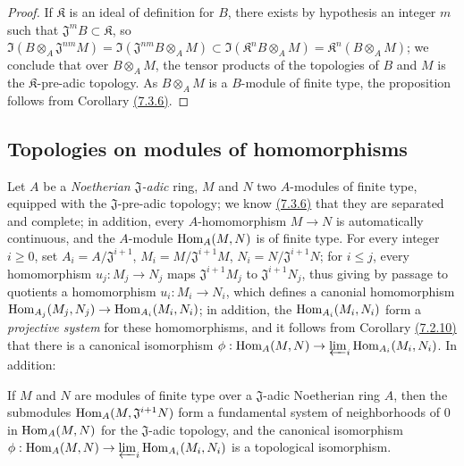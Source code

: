 \begin{proof}
\label{proof-0.7.7.8}
If $\mathfrak{K}$ is an ideal of definition for $B$, there exists by hypothesis an integer $m$ such
that $\mathfrak{J}^m B\subset\mathfrak{K}$, so
$\Im(B\otimes_A\mathfrak{J}^{nm}M)=\Im(\mathfrak{J}^{nm}B\otimes_A M)
  \subset\Im(\mathfrak{K}^n B\otimes_A M)=\mathfrak{K}^n(B\otimes_A M)$;
we conclude that over $B\otimes_A M$, the tensor products of the topologies of $B$ and $M$ is the
$\mathfrak{K}$-pre-adic topology. As $B\otimes_A M$ is a $B$-module of finite type, the proposition
follows from Corollary \hyperref[0.7.3.6]{(7.3.6)}.
\end{proof}

\subsection{Topologies on modules of homomorphisms}
\label{subsection-topologies-on-hom-modules}

\begin{env}[7.8.1]
\label{0.7.8.1}
Let $A$ be a {\em Noetherian $\mathfrak{J}$-adic} ring, $M$ and $N$ two $A$-modules of finite type,
equipped with the $\mathfrak{J}$-pre-adic topology; we know \hyperref[0.7.3.6]{(7.3.6)} that they are
separated and complete; in addition, every $A$-homomorphism $M\to N$ is automatically continuous, and
the $A$-module ${\mathop{\mathrm{Hom}}\nolimits}_A(M,N)$ is of finite type. For every integer $i\geqslant 0$, set
$A_i=A/\mathfrak{J}^{i+1}$, $M_i=M/\mathfrak{J}^{i+1}M$, $N_i=N/\mathfrak{J}^{i+1}N$; for
$i\leqslant j$, every homomorphism $u_j:M_j\to N_j$ maps $\mathfrak{J}^{i+1}M_j$ to
$\mathfrak{J}^{i+1}N_j$, thus giving by passage to quotients a homomorphism $u_i:M_i\to N_i$, which
defines a canonial homomorphism ${\mathop{\mathrm{Hom}}\nolimits}_{A_j}(M_j,N_j)\to{\mathop{\mathrm{Hom}}\nolimits}_{A_i}(M_i,N_i)$; in addition, the
${\mathop{\mathrm{Hom}}\nolimits}_{A_i}(M_i,N_i)$ form a {\em projective system} for these homomorphisms, and it follows from
Corollary \hyperref[0.7.2.10]{(7.2.10)} that there is a canonical isomorphism
$\phi:{\mathop{\mathrm{Hom}}\nolimits}_A(M,N)\to\varprojlim_i{\mathop{\mathrm{Hom}}\nolimits}_{A_i}(M_i,N_i)$. In addition:
\end{env}

\begin{prop}[7.8.2]
\label{0.7.8.2}
If $M$ and $N$ are modules of finite type over a $\mathfrak{J}$-adic Noetherian ring $A$, then the
submodules ${\mathop{\mathrm{Hom}}\nolimits}_A(M,\mathfrak{J}^{i+1}N)$ form a fundamental system of neighborhoods of $0$ in
${\mathop{\mathrm{Hom}}\nolimits}_A(M,N)$ for the $\mathfrak{J}$-adic topology, and the canonical isomorphism
$\phi:{\mathop{\mathrm{Hom}}\nolimits}_A(M,N)\to\varprojlim_i{\mathop{\mathrm{Hom}}\nolimits}_{A_i}(M_i,N_i)$ is a topological isomorphism.
\end{prop}

